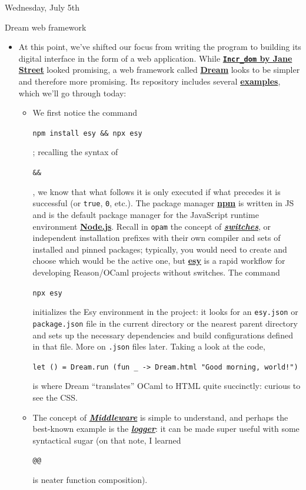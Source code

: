 \documentclass[11pt]{article}
\newcommand\codebox[1]{
    \noindent\hspace{-0.25em}\begin{tcolorbox}[on line, hbox, colback = codeblack, colframe = codeborder, coltext = white, boxrule = 1.5pt, left = 2pt, right = 2pt, top = 0.5pt, bottom = 0.5pt]
    \small\texttt{#1}\normalsize
    \end{tcolorbox}\hspace{-0.25em}
}
\begin{document}
\begin{hulkgreenbox}{Wednesday, July 5th\vspace{-2.2em}\begin{flushright}Dream web framework \end{flushright}}
    \begin{itemize}
        \item At this point, we've shifted our focus from writing the program to building its digital interface in the form of a web application. While \href{https://opensource.janestreet.com/incr_dom/}{\textbf{\texttt{Incr\_dom} by Jane Street}} looked promising, a web framework called \href{https://aantron.github.io/dream/}{\textbf{Dream}} looks to be simpler and therefore more promising. Its repository includes several \href{https://github.com/aantron/dream/tree/master/example}{\textbf{examples}}, which we'll go through today:
        \begin{itemize}
            \item\href{https://github.com/aantron/dream/tree/master/example/1-hello}{} We first notice the command \codebox{npm install esy \&\& npx esy}; recalling the syntax of \codebox{\&\&}, we know that what follows it is only executed if what precedes it is successful (or \texttt{true}, \texttt{0}, etc.). The package manager \href{https://www.npmjs.com/}{\textbf{npm}} is written in JS and is the default package manager for the JavaScript runtime environment \href{https://nodejs.org/en}{\textbf{Node.js}}. Recall in \texttt{opam} the concept of \href{https://opam.ocaml.org/doc/man/opam-switch.html}{\textbf{\textit{switches}}}, or independent installation prefixes with their own compiler and sets of installed and pinned packages; typically, you would need to create and choose which would be the active one, but \href{https://esy.sh/docs/en/what-why.html}{\textbf{esy}} is a rapid workflow for developing Reason/OCaml projects without switches. The command \codebox{npx esy} initializes the Esy environment in the project: it looks for an \texttt{esy.json} or \texttt{package.json} file in the current directory or the nearest parent directory and sets up the necessary dependencies and build configurations defined in that file. More on \texttt{.json} files later. Taking a look at the code, \codebox{let () = Dream.run (fun \_ -> Dream.html "Good morning, world!")} is where Dream ``translates'' OCaml to HTML quite succinctly: curious to see the CSS.

            \item\href{https://github.com/aantron/dream/tree/master/example/2-middleware}{} The concept of \href{https://www.redhat.com/en/topics/middleware/what-is-middleware}{\textbf{\textit{Middleware}}} is simple to understand, and perhaps the best-known example is the \href{https://ocaml.org/p/dream/1.0.0~alpha4/doc/Dream/index.html#logging}{\textbf{\textit{logger}}}: it can be made super useful with some syntactical sugar (on that note, I learned \codebox{@@} is neater function composition).


\end{itemize}
\end{itemize}
\end{hulkgreenbox}
\end{document}
